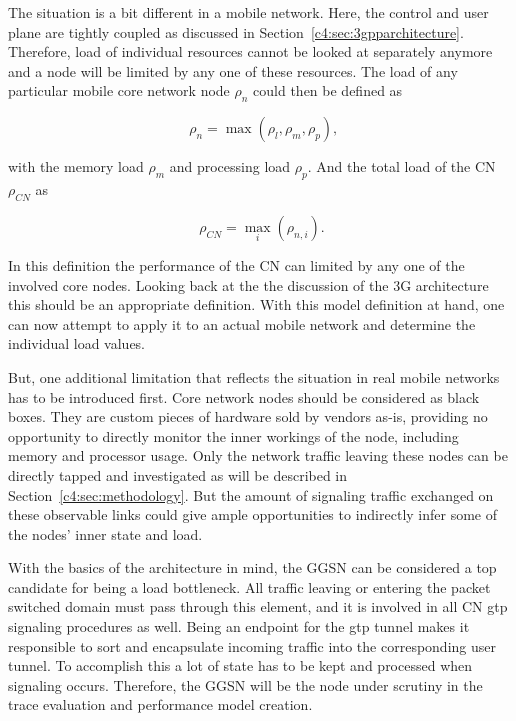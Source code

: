 The situation is a bit different in a mobile network. Here, the control and user plane are tightly coupled as discussed in Section~\ref{c4:sec:3gpparchitecture}.  Therefore, load of individual resources cannot be looked at separately anymore and a node will be limited by any one of these resources. The load of any particular mobile core network node $\rho_{n}$ could then be defined as

\begin{equation}
	\phantom{,}\rho_{n} = \max(\rho_{l}, \rho_{m}, \rho_{p})\text{,}
\end{equation}

with the memory load $\rho_{m}$ and processing load $\rho_{p}$. And the total load of the \gls{CN} $\rho_{CN}$ as

\begin{equation}
	\phantom{.}\rho_{CN} = \max_{i}(\rho_{n,i})\text{.}
\end{equation}

In this definition the performance of the \gls{CN} can limited by any one of the involved core nodes. Looking back at the the discussion of the \gls{3G} architecture this should be an appropriate definition. With this model definition at hand, one can now attempt to apply it to an actual mobile network and determine the individual load values. 

But, one additional limitation that reflects the situation in real mobile networks has to be introduced first. Core network nodes should be considered as black boxes. They are custom pieces of hardware sold by vendors as-is, providing no opportunity to directly monitor the inner workings of the node, including memory and processor usage. Only the network traffic leaving these nodes can be directly tapped and investigated as will be described in Section~\ref{c4:sec:methodology}. But the amount of signaling traffic exchanged on these observable links could give ample opportunities to indirectly infer some of the nodes' inner state and load.

With the basics of the architecture in mind, the \gls{GGSN} can be considered a top candidate for being a load bottleneck. All traffic leaving or entering the packet switched domain must pass through this element, and it is involved in all \gls{CN} \gls{gtp} signaling procedures as well. Being an endpoint for the \gls{gtp} tunnel makes it responsible to sort and encapsulate incoming traffic into the corresponding user tunnel. To accomplish this a lot of state has to be kept and processed when signaling occurs. Therefore, the \gls{GGSN} will be the node under scrutiny in the trace evaluation and performance model creation.

